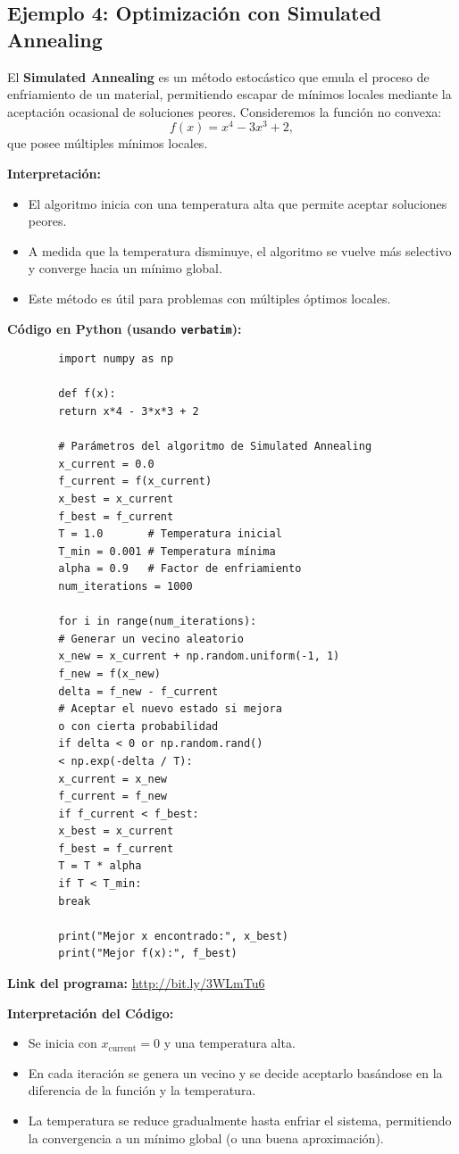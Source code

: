 \documentclass[12pt,a4,oneside]{book}
\begin{document}
	\subsection{Ejemplo 4: Optimización con Simulated Annealing}
	
	El \textbf{Simulated Annealing} es un método estocástico que emula el proceso de enfriamiento de un material, permitiendo escapar de mínimos locales mediante la aceptación ocasional de soluciones peores. Consideremos la función no convexa:
	\[
	f(x) = x^4 - 3x^3 + 2,
	\]
	que posee múltiples mínimos locales.
	
	\textbf{Interpretación:}  
	\begin{itemize}
		\item El algoritmo inicia con una temperatura alta que permite aceptar soluciones peores.
		\item A medida que la temperatura disminuye, el algoritmo se vuelve más selectivo y converge hacia un mínimo global.
		\item Este método es útil para problemas con múltiples óptimos locales.
	\end{itemize}
	
	\textbf{Código en Python (usando \texttt{verbatim}):}
	\begin{verbatim}
		import numpy as np
		
		def f(x):
		return x*4 - 3*x*3 + 2
		
		# Parámetros del algoritmo de Simulated Annealing
		x_current = 0.0
		f_current = f(x_current)
		x_best = x_current
		f_best = f_current
		T = 1.0       # Temperatura inicial
		T_min = 0.001 # Temperatura mínima
		alpha = 0.9   # Factor de enfriamiento
		num_iterations = 1000
		
		for i in range(num_iterations):
		# Generar un vecino aleatorio
		x_new = x_current + np.random.uniform(-1, 1)
		f_new = f(x_new)
		delta = f_new - f_current
		# Aceptar el nuevo estado si mejora
		o con cierta probabilidad
		if delta < 0 or np.random.rand() 
		< np.exp(-delta / T):
		x_current = x_new
		f_current = f_new
		if f_current < f_best:
		x_best = x_current
		f_best = f_current
		T = T * alpha
		if T < T_min:
		break
		
		print("Mejor x encontrado:", x_best)
		print("Mejor f(x):", f_best)
	\end{verbatim}
	
	\textbf{Link del programa:} \url{http://bit.ly/3WLmTu6}
	
	\textbf{Interpretación del Código:}  
	\begin{itemize}
		\item Se inicia con \(x_{\text{current}} = 0\) y una temperatura alta.
		\item En cada iteración se genera un vecino y se decide aceptarlo basándose en la diferencia de la función y la temperatura.
		\item La temperatura se reduce gradualmente hasta enfriar el sistema, permitiendo la convergencia a un mínimo global (o una buena aproximación).
	\end{itemize}
	
\end{document}
